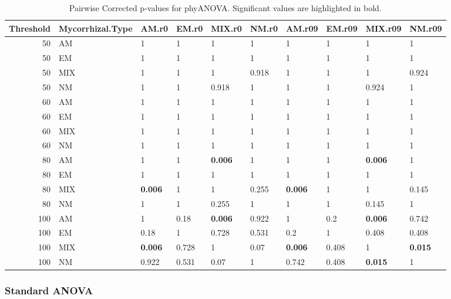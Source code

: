 \documentclass[]{article}
\begin{document}
\begin{table}[H]

\caption{\label{tab:unnamed-chunk-42}Pairwise Corrected p-values for phyANOVA. Significant values are highlighted in bold.}
\centering
\begin{tabular}{r|l|l|l|l|l|l|l|l|l}
\hline
Threshold & Mycorrhizal.Type & AM.r0 & EM.r0 & MIX.r0 & NM.r0 & AM.r09 & EM.r09 & MIX.r09 & NM.r09\\
\hline
50 & AM & 1 & 1 & 1 & 1 & 1 & 1 & 1 & 1\\
\hline
50 & EM & 1 & 1 & 1 & 1 & 1 & 1 & 1 & 1\\
\hline
50 & MIX & 1 & 1 & 1 & 0.918 & 1 & 1 & 1 & 0.924\\
\hline
50 & NM & 1 & 1 & 0.918 & 1 & 1 & 1 & 0.924 & 1\\
\hline
60 & AM & 1 & 1 & 1 & 1 & 1 & 1 & 1 & 1\\
\hline
60 & EM & 1 & 1 & 1 & 1 & 1 & 1 & 1 & 1\\
\hline
60 & MIX & 1 & 1 & 1 & 1 & 1 & 1 & 1 & 1\\
\hline
60 & NM & 1 & 1 & 1 & 1 & 1 & 1 & 1 & 1\\
\hline
80 & AM & 1 & 1 & \textbf{0.006} & 1 & 1 & 1 & \textbf{0.006} & 1\\
\hline
80 & EM & 1 & 1 & 1 & 1 & 1 & 1 & 1 & 1\\
\hline
80 & MIX & \textbf{0.006} & 1 & 1 & 0.255 & \textbf{0.006} & 1 & 1 & 0.145\\
\hline
80 & NM & 1 & 1 & 0.255 & 1 & 1 & 1 & 0.145 & 1\\
\hline
100 & AM & 1 & 0.18 & \textbf{0.006} & 0.922 & 1 & 0.2 & \textbf{0.006} & 0.742\\
\hline
100 & EM & 0.18 & 1 & 0.728 & 0.531 & 0.2 & 1 & 0.408 & 0.408\\
\hline
100 & MIX & \textbf{0.006} & 0.728 & 1 & 0.07 & \textbf{0.006} & 0.408 & 1 & \textbf{0.015}\\
\hline
100 & NM & 0.922 & 0.531 & 0.07 & 1 & 0.742 & 0.408 & \textbf{0.015} & 1\\
\hline
\end{tabular}
\end{table}

\hypertarget{standard-anova-7}{%
\subsubsection{Standard ANOVA}\label{standard-anova-7}}
\end{document}
